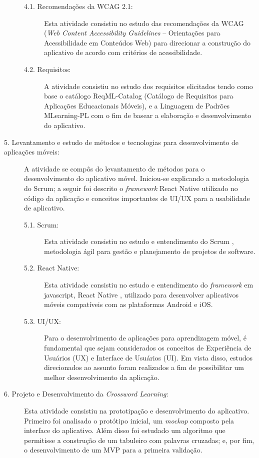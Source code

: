 \begin{description}
\begin{description}
    \item[4.1. Recomendações da WCAG 2.1:]
    Esta atividade consistiu no estudo das recomendações da WCAG (\textit{Web Content Accessibility Guidelines} -- Orientações para Acessibilidade em Conteúdos Web) para direcionar a construção do aplicativo de acordo com critérios de acessibilidade.
    
    \item[4.2. Requisitos:]
    A atividade consistiu no estudo dos requisitos elicitados tendo como base o catálogo ReqML-Catalog (Catálogo de Requisitos para Aplicações Educacionais Móveis), e a Linguagem de Padrões MLearning-PL com o fim de basear a elaboração e desenvolvimento do aplicativo.
\end{description}


\item[5. Levantamento e estudo de métodos e tecnologias para desenvolvimento de aplicações móveis:]
A atividade se compôs do levantamento de métodos para o desenvolvimento do aplicativo móvel. Iniciou-se explicando a metodologia do Scrum; a seguir foi descrito o \textit{framework} React Native utilizado no código da aplicação e conceitos importantes de UI/UX para a usabilidade de aplicativo. 

\begin{description}
\item[5.1. Scrum:] Esta atividade consistiu no estudo e entendimento do Scrum \citep{schwaber1997scrum}, metodologia ágil para gestão e planejamento de projetos de software. %

\item[5.2. React Native:] Esta atividade consistiu no estudo e entendimento do \textit{framework} em javascript, React Native \citep{RN}, utilizado para desenvolver aplicativos móveis compatíveis com as plataformas Android e iOS.

\item[5.3. UI/UX:] Para o desenvolvimento de aplicações para aprendizagem móvel, é fundamental que sejam considerados os conceitos de Experiência de Usuários (UX) e Interface de Usuários (UI). Em vista disso, estudos direcionados ao assunto foram realizados a fim de possibilitar um melhor desenvolvimento da aplicação.

\end{description}

\item[6. Projeto e Desenvolvimento da \textit{Crossword Learning}:]
Esta atividade consistiu na prototipação e desenvolvimento do aplicativo. Primeiro foi analisado o protótipo inicial, um \textit{mockup} composto pela interface do aplicativo. Além disso foi estudado um algoritmo que permitisse a construção de um tabuleiro com palavras cruzadas; e, por fim, o desenvolvimento de um MVP para a primeira validação.


\end{description}
